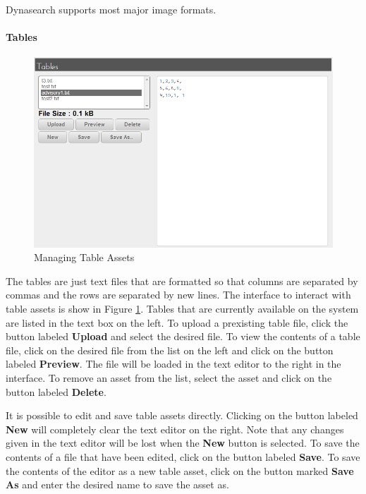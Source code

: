 \documentclass[article]{ij4uq}              %
\begin{document}
Dynasearch supports most major image formats.

\paragraph{Tables}

\begin{figure}[htb]
 \centering
 \includegraphics[width=5.0in]{figures/manage_tables.png}
 \caption{Managing Table Assets}
 \label{fig:manageTab}
\end{figure}
\FloatBarrier

The tables are just text files that are formatted so that columns are separated by commas and the rows are separated by new lines.  The interface to interact with table assets is show in Figure \ref{fig:manageTab}.  Tables  that are currently available on the system are listed in the text box on the left. To upload a prexisting table file, click the button labeled \textbf{Upload} and select the desired file.  To view the contents of a table file, click on the desired file from the list on the left and click on the button labeled \textbf{Preview}.  The file will be loaded in the text editor to the right in the interface.  To remove an asset from the list, select the asset and click on the button labeled \textbf{Delete}.

It is possible to edit and save table assets directly.  Clicking on the button labeled \textbf{New} will completely clear the text editor on the right.  Note that any changes given in the text editor will be lost when the \textbf{New} button is selected.  To save the contents of a file that have been edited, click on the button labeled \textbf{Save}.  To save the contents of the editor as a new table asset, click on the button marked \textbf{Save As} and enter the desired name to save the asset as.
\end{document}
